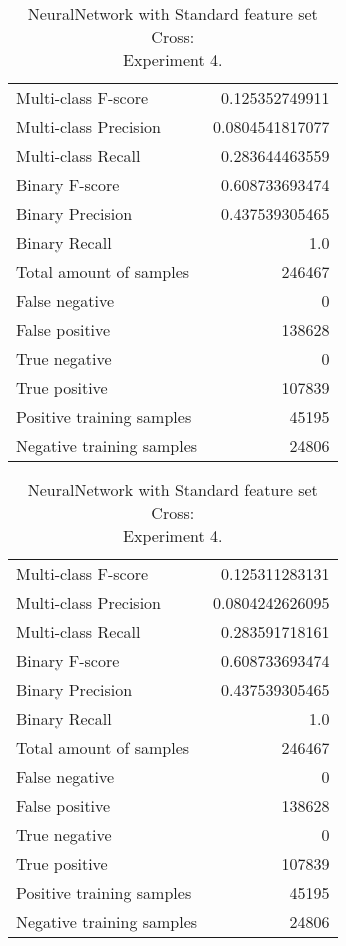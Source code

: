 \begin{table}[H]
\begin{minipage}{0.5\textwidth}
\caption{NeuralNetwork with Standard feature set Cross: \\Experiment 3.}
\centering
\begin{tabular}{l r}
\toprule
Multi-class F-score & 0.125352749911 \\
Multi-class Precision & 0.0804541817077 \\
Multi-class Recall & 0.283644463559 \\
\midrule
Binary F-score & 0.608733693474 \\
Binary Precision & 0.437539305465 \\
Binary Recall & 1.0 \\
\midrule
Total amount of samples & 246467 \\
False negative & 0 \\
False positive & 138628 \\
True negative & 0 \\
True positive & 107839 \\
\midrule
Positive training samples & 45195 \\
Negative training samples & 24806 \\
\bottomrule
\end{tabular}
\end{minipage}
\hfillx
\begin{minipage}{0.5\textwidth}
\caption{NeuralNetwork with Standard feature set Cross: \\Experiment 4.}
\centering
\begin{tabular}{l r}
\toprule
Multi-class F-score & 0.125311283131 \\
Multi-class Precision & 0.0804242626095 \\
Multi-class Recall & 0.283591718161 \\
\midrule
Binary F-score & 0.608733693474 \\
Binary Precision & 0.437539305465 \\
Binary Recall & 1.0 \\
\midrule
Total amount of samples & 246467 \\
False negative & 0 \\
False positive & 138628 \\
True negative & 0 \\
True positive & 107839 \\
\midrule
Positive training samples & 45195 \\
Negative training samples & 24806 \\
\bottomrule
\end{tabular}
\end{minipage}
\end{table}
